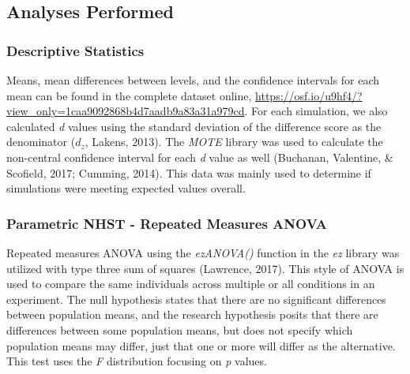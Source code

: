 \documentclass[english,mask,man]{apa6}
\theoremstyle{definition}
\theoremstyle{definition}
\theoremstyle{definition}
\theoremstyle{remark}
\begin{document}
\subsection{Analyses Performed}\label{analyses-performed}

\subsubsection{Descriptive Statistics}\label{descriptive-statistics}

Means, mean differences between levels, and the confidence intervals for
each mean can be found in the complete dataset online,
\url{https://osf.io/u9hf4/?view_only=1caa9092868b4d7aadb9a83a31a979cd}.
For each simulation, we also calculated \emph{d} values using the
standard deviation of the difference score as the denominator
(\(d_{z}\), Lakens, 2013). The \emph{MOTE} library was used to calculate
the non-central confidence interval for each \emph{d} value as well
(Buchanan, Valentine, \& Scofield, 2017; Cumming, 2014). This data was
mainly used to determine if simulations were meeting expected values
overall.

\subsubsection{Parametric NHST - Repeated Measures
ANOVA}\label{parametric-nhst---repeated-measures-anova}

Repeated measures ANOVA using the \emph{ezANOVA()} function in the
\emph{ez} library was utilized with type three sum of squares (Lawrence,
2017). This style of ANOVA is used to compare the same individuals
across multiple or all conditions in an experiment. The null hypothesis
states that there are no significant differences between population
means, and the research hypothesis posits that there are differences
between some population means, but does not specify which population
means may differ, just that one or more will differ as the alternative.
This test uses the \emph{F} distribution focusing on \emph{p} values.
\end{document}
